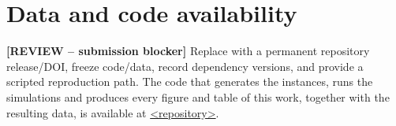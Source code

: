 \section*{Data and code availability}

{\color{red}\textbf{[REVIEW -- submission blocker]} Replace with a permanent repository release/DOI, freeze code/data, record dependency versions, and provide a scripted reproduction path.} The code that generates the instances, runs the simulations and produces every figure and table of this work, together with the resulting data, is available at \url{<repository>}.